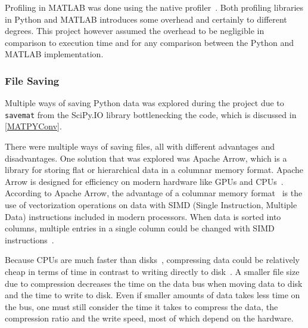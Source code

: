 \documentclass[12pt, a4paper]{article}
\begin{document}
Profiling in MATLAB was done using the native profiler~\cite{matProfile}.
Both profiling libraries in Python and MATLAB introduces some overhead and certainly to different degrees.
This project however assumed the overhead to be negligible in comparison to execution time and for any comparison between the Python and MATLAB implementation.%

\subsubsection{File Saving}

Multiple ways of saving Python data was explored during the project due to \texttt{savemat} from the SciPy.IO library bottlenecking the code, which is discussed in \cref{MATPYConv}.


There were multiple ways of saving files, all with different advantages and disadvantages.
One solution that was explored was Apache Arrow, which is a library for storing flat or hierarchical data in a columnar memory format.
Apache Arrow is designed for efficiency on modern hardware like GPUs and CPUs~\cite{AA:apacheArrow}.
According to Apache Arrow, the advantage of a columnar memory format~\cite{enwiki:columnarData,AWS:columnarData} is the use of vectorization operations on data with SIMD (Single Instruction, Multiple Data) instructions included in modern processors.
When data is sorted into columns, multiple entries in a single column could be changed with SIMD instructions~\cite{AA:Overview}.


Because CPUs are much faster than disks~\cite{DiskSlow}, compressing data could be relatively cheap in terms of time in contrast to writing directly to disk~\cite{1607248}.
A smaller file size due to compression decreases the time on the data bus when moving data to disk and the time to write to disk.
Even if smaller amounts of data takes less time on the bus, one must still consider the time it takes to compress the data, the compression ratio and the write speed, most of which depend on the hardware.
\end{document}
